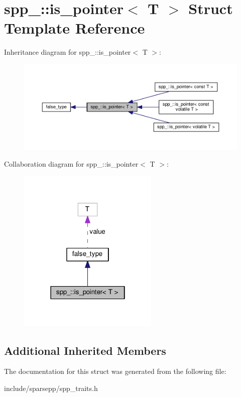 \hypertarget{structspp___1_1is__pointer}{}\section{spp\+\_\+\+:\+:is\+\_\+pointer$<$ T $>$ Struct Template Reference}
\label{structspp___1_1is__pointer}


Inheritance diagram for spp\+\_\+\+:\+:is\+\_\+pointer$<$ T $>$\+:\nopagebreak
\begin{figure}[H]
\begin{center}
\leavevmode
\includegraphics[width=350pt]{structspp___1_1is__pointer__inherit__graph}
\end{center}
\end{figure}


Collaboration diagram for spp\+\_\+\+:\+:is\+\_\+pointer$<$ T $>$\+:\nopagebreak
\begin{figure}[H]
\begin{center}
\leavevmode
\includegraphics[width=190pt]{structspp___1_1is__pointer__coll__graph}
\end{center}
\end{figure}
\subsection*{Additional Inherited Members}


The documentation for this struct was generated from the following file\+:\begin{DoxyCompactItemize}
\item 
include/sparsepp/spp\+\_\+traits.\+h\end{DoxyCompactItemize}
